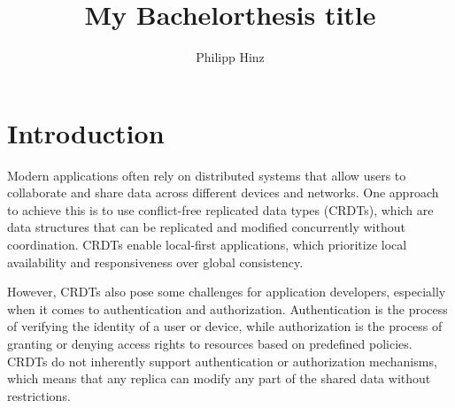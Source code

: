 \documentclass[
	ngerman,
	ruledheaders=section,   %
	class=report,		    %
	thesis={type=bachelor}, %
	accentcolor=9c,			%
	custommargins=true,    %
	marginpar=false,        %
	parskip=half-,          %
	fontsize=11pt,          %
]{tudapub}
\begin{document}

\title{My Bachelorthesis title}
\author[P. Hinz]{Philipp Hinz} %



\submissiondate{\today}
\examdate{\today}

\maketitle

\affidavit

\tableofcontents

\chapter{Introduction}
Modern applications often rely on distributed systems that allow users to collaborate and share data across different devices and networks. One approach to achieve this is to use conflict-free replicated data types (CRDTs), which are data structures that can be replicated and modified concurrently without coordination. CRDTs enable local-first applications, which prioritize local availability and responsiveness over global consistency.

However, CRDTs also pose some challenges for application developers, especially when it comes to authentication and authorization. Authentication is the process of verifying the identity of a user or device, while authorization is the process of granting or denying access rights to resources based on predefined policies. CRDTs do not inherently support authentication or authorization mechanisms, which means that any replica can modify any part of the shared data without restrictions.
\end{document}
